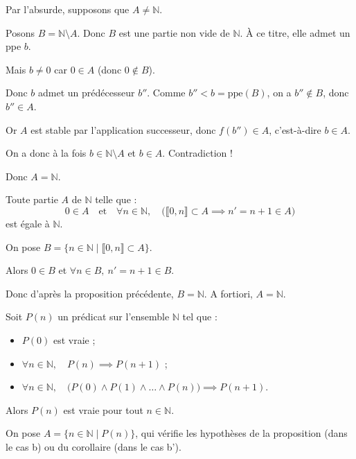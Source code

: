 \documentclass[a4paper,11pt]{article}
\newcommand{\N}{\mathbb{N}}
\begin{document}
\begin{demonstration}
Par l'absurde, supposons que $A \neq \N$. 

Posons $B = \N \setminus A$. Donc $B$ est une partie non vide de $\N$. À ce titre, elle admet un ppe $b$.

Mais $b \neq 0$ car $0 \in A$ (donc $0 \notin B$).

Donc $b$ admet un prédécesseur $b''$. Comme $b'' < b = \text{ppe}(B)$, on a $b'' \notin B$, donc $b'' \in A$.

Or $A$ est stable par l'application successeur, donc $f(b'') \in A$, c'est-à-dire $b \in A$.

On a donc à la fois $b \in \N \setminus A$ et $b \in A$. Contradiction !

Donc $A = \N$.
\end{demonstration}

\begin{theoreme}[Corollaire]
Toute partie $A$ de $\N$ telle que :
\[
0 \in A \quad \text{et} \quad \forall n \in \N, \quad \big( \llbracket 0, n \rrbracket \subset A \implies n' = n + 1 \in A \big)
\]
est égale à $\N$.
\end{theoreme}

\begin{demonstration}
On pose $B = \{ n \in \N \mid \llbracket 0, n \rrbracket \subset A \}$.

Alors $0 \in B$ et $\forall n \in B, \ n' = n + 1 \in B$.

Donc d'après la proposition précédente, $B = \N$. A fortiori, $A = \N$.
\end{demonstration}

\begin{theoreme}
Soit $P(n)$ un prédicat sur l'ensemble $\N$ tel que :
\begin{itemize}
    \item[\textbf{a)}] $P(0)$ est vraie ;
    \item[\textbf{b)}] $\forall n \in \N, \quad P(n) \implies P(n+1)$ ;
    \item[\textbf{ou b')}] $\forall n \in \N, \quad \big( P(0) \land P(1) \land \dots \land P(n) \big) \implies P(n+1)$.
\end{itemize}
Alors $P(n)$ est vraie pour tout $n \in \N$.
\end{theoreme}

\begin{demonstration}
On pose $A = \{ n \in \N \mid P(n) \}$, qui vérifie les hypothèses de la proposition (dans le cas b) ou du corollaire (dans le cas b').
\end{demonstration}
\end{document}
